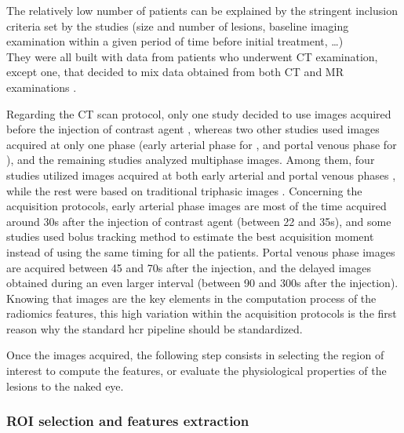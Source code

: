 The relatively low number of patients can be explained by the stringent
inclusion criteria set by the studies (size and number of lesions,
baseline imaging examination within a given period of time before
initial treatment, \ldots{})\\
They were all built with data from patients who underwent CT
examination, except one, that decided to mix data obtained from both CT
and MR examinations \cite{Taouli2017}.

Regarding the CT scan protocol, only one study decided to use images
acquired before the injection of contrast agent \cite{Cozzi2017}, whereas two other studies used images acquired at only one
phase (early arterial phase for \cite{Raman2015}, and portal
venous phase for \cite{Li2016}), and the remaining studies
analyzed multiphase images. Among them, four studies utilized images
acquired at both early arterial and portal venous phases \cite{Zhou2017a,Chen2017,Kuo2007,Zheng2018}, while the rest were
based on traditional triphasic images \cite{Akai2018,Banerjee2015,Renzulli2016,Segal2007,Peng2018,Bakr2017,Taouli2017,Xia2018}. Concerning the
acquisition protocols, early arterial phase images are most of the time
acquired around 30s after the injection of contrast agent (between 22
and 35s), and some studies used bolus tracking method to estimate the
best acquisition moment instead of using the same timing for all the
patients. Portal venous phase images are acquired between 45 and 70s
after the injection, and the delayed images obtained during an even
larger interval (between 90 and 300s after the injection).\\
Knowing that images are the key elements in the computation process of
the radiomics features, this high variation within the acquisition
protocols is the first reason why the standard \ac{hcr} pipeline
should be standardized.

Once the images acquired, the following step consists in selecting the
region of interest to compute the features, or evaluate the
physiological properties of the lesions to the naked eye.

\subsubsection{ROI selection and features extraction}\label{roi-selection}

